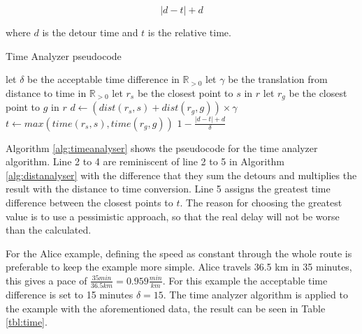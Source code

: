 \[ |d - t| + d \]

where $d$ is the detour time and $t$ is the relative time.

\iffalse
Now, let us consider what would happen on the return route.
The situation is now that the driver and passenger want to return to their original locations, but they want to leave at a specific time.
The algorithm already solves this because if a specific arrival time is defined a specific departure time must also be defined.
And the differences in time must be the same.
\fi

\begin{algorithm}
	\caption{Time Analyzer pseudocode}
	\label{alg:timeanalyser}
	\begin{algorithmic}[1]
		\Require 
		\Statex let $\delta$ be the acceptable time difference in $\mathbb{R}_{>0}$
		\Statex let $\gamma$ be the translation from distance to time in $\mathbb{R}_{>0}$ 
		\Statex 
			\State let $r_s$ be the closest point to $s$ in $r$
			\State let $r_g$ be the closest point to $g$ in $r$
			\State $d \gets (dist(r_s,s) + dist(r_g,g))\times\gamma$
			\State $t \gets max(time(r_s, s), time(r_g, g))$
			\State\Return $1-\frac{|d - t| + d}{\delta}$
		\EndFunction
	\end{algorithmic}
\end{algorithm}

Algorithm \ref{alg:timeanalyser} shows the pseudocode for the time analyzer algorithm.
Line 2 to 4 are reminiscent of line 2 to 5 in Algorithm \ref{alg:distanalyser} with the difference that they sum the detours and multiplies the result with the distance to time conversion.
Line 5 assigns the greatest time difference between the closest points to $t$.
The reason for choosing the greatest value is to use a pessimistic approach, so that the real delay will not be worse than the calculated.

For the Alice example, defining the speed as constant through the whole route is preferable to keep the example more simple.
Alice travels 36.5 km in 35 minutes, this gives a pace of  $\frac{35 min}{36.5 km} = 0.959\frac{min}{km} $.
For this example the acceptable time difference is set to 15 minutes $\delta = 15$.
The time analyzer algorithm is applied to the example with the aforementioned data, the result can be seen in Table \ref{tbl:time}.

